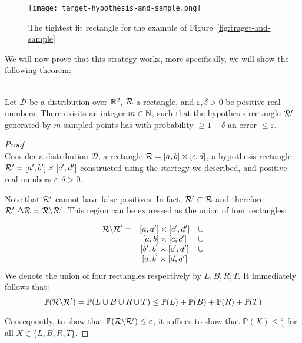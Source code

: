 \begin{figure}
    \begin{center}
        \texttt{[image: target-hypothesis-and-sample.png]}
    \end{center}
    \caption{The tightest fit rectangle for the example of Figure~\ref{fig:traget-and-sample}}
    \label{fig:traget-hypothesis-and-sample}
\end{figure}



We will now prove that this strategy works, more specifically, we will show the following theorem:

\begin{theorem}
    \ \\
    Let \(\mathcal{D}\) be a distribution over \(\mathbb{R}^2\), \(\mathcal{R}\) a rectangle, and \(\varepsilon, \delta>0\) be positive real numbers.
    There exisits an integer \(m\in\mathbb{N}\), such that the hypothesis rectangle \(\mathcal{R}^\prime\) generated by \(m\) sampled points has with probability \(\ge 1 - \delta\) an error \(\le\varepsilon\).
\end{theorem}

\begin{proof}
    \ \\
    Consider a distribution \(\mathcal{D}\), a rectangle \(\mathcal{R} = [a, b]\times[c, d]\), a hypothesis rectangle \(\mathcal{R}^\prime = [a^\prime, b^\prime] \times [c^\prime, d^\prime]\) constructed using the startegy we described, and positive real numbers \(\varepsilon, \delta>0\).

    Note that \(\mathcal{R}^\prime\) cannot have false positives. In fact, \(\mathcal{R}^\prime\subset\mathcal{R}\) and therefore \(\mathcal{R}^\prime~\Delta\mathcal{R} = \mathcal{R}\backslash\mathcal{R}^\prime\). 
    This region can be expressed as the union of four rectangles: 

    \[
        \begin{array}{ccc}
            \mathcal{R}\backslash\mathcal{R}^\prime = & [a, a^\prime] \times [c^\prime, d^\prime]& \cup\\
                & [a, b] \times [c, c^\prime] & \cup\\
                & [b^\prime, b] \times [c^\prime, d^\prime] & \cup\\
                & [a, b] \times [d, d^\prime]
        \end{array}
    \]
    We denote the union of four rectangles respectively by \(L, B, R, T\). It immediately follows that:
    \[
        \mathbb{P}(\mathcal{R}\backslash\mathcal{R}^\prime) = \mathbb{P}(L \cup B \cup R \cup T) \le \mathbb{P}(L) + \mathbb{P}(B) + \mathbb{P}(R) + \mathbb{P}(T)    
    \]
    
    Consequently, to show that \(\mathbb{P}(\mathcal{R}\backslash\mathcal{R}^\prime) \le \varepsilon\), it suffices to show that \(\mathbb{P}(X) \le \frac{\varepsilon}{4}\) for all \(X\in\{L, B, R, T\}\).

\end{proof}